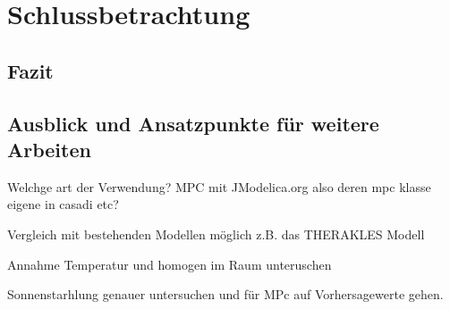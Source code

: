 %
%

\renewcommand{\chapterheadstartvskip}{\vspace*{3cm}}

\chapter{Schlussbetrachtung}
\label{chap:schlussteil}
\renewcommand{\chapterheadstartvskip}{\vspace*{-0.5cm}}

\section{Fazit}
\label{sec:zusammenfassung}


\section{Ausblick und Ansatzpunkte für weitere Arbeiten}
\label{sec:ausblick}

Welchge art der Verwendung?
MPC mit JModelica.org also deren mpc klasse
eigene in casadi
etc?

Vergleich mit bestehenden Modellen möglich z.B. das THERAKLES Modell

Annahme Temperatur und homogen im Raum unteruschen

Sonnenstarhlung genauer untersuchen und für MPc auf Vorhersagewerte gehen.